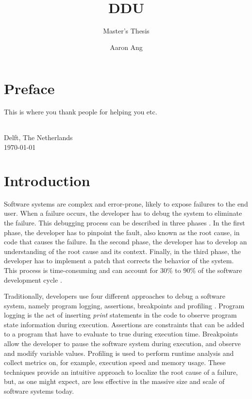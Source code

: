 \documentclass[twoside,a4paper,11pt]{memoir}
\title{DDU}
\subtitle{Master's Thesis}
\author{Aaron Ang}
\begin{document}
\frontmatter
\thispagestyle{empty}
\maketitle
{}

\chapter{Preface}
\label{ch:preface}

This is where you thank people for helping you etc.

\vskip1cm
\begin{flushright}
\theauthor\\
Delft, The Netherlands \\
\today\\
\end{flushright}

\cleardoublepage\tableofcontents
\cleardoublepage\listoffigures
\cleardoublepage\mainmatter

\chapter{Introduction}
\label{ch:introduction}
Software systems are complex and error-prone, likely to expose failures to the end user.
When a failure occurs, the developer has to debug the system to eliminate the failure.
This debugging process can be described in three phases \cite{parnin2011automated}.
In the first phase, the developer has to pinpoint the fault, also known as the root cause, in code that causes the failure.
In the second phase, the developer has to develop an understanding of the root cause and its context.
Finally, in the third phase, the developer has to implement a patch that corrects the behavior of the system.
This process is time-consuming and can account for 30\% to 90\% of the software development cycle \cite{robbins2003debugging, beizer2003software, britton2013reversible}.

Traditionally, developers use four different approaches to debug a software system, namely program logging, assertions, breakpoints and profiling \cite{wong2016survey}.
Program logging is the act of inserting \emph{print} statements in the code to observe program state information during execution.
Assertions are constraints that can be added to a program that have to evaluate to true during execution time.
Breakpoints allow the developer to pause the software system during execution, and observe and modify variable values.
Profiling is used to perform runtime analysis and collect metrics on, for example, execution speed and memory usage.
These techniques provide an intuitive approach to localize the root cause of a failure, but, as one might expect, are less effective in the massive size and scale of software systems today.
\end{document}
